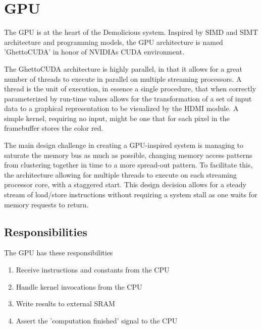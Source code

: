 \documentclass[../main/report.tex]{subfiles}
\begin{document}
\chapter{GPU}

The GPU is at the heart of the Demolicious system.
Inspired by SIMD and SIMT architecture and programming models, the GPU architecture is named 'GhettoCUDA' in honor of NVIDIAs CUDA environment.

The GhettoCUDA architecture is highly parallel, in that it allows for a great number of threads to execute in parallel on multiple streaming processors.
A thread is the unit of execution, in essence a single procedure, that when correctly parameterized by run-time values allows for the transformation of a set of input data to a graphical representation to be visualized by the HDMI module.
A simple kernel, requiring no input, might be one that for each pixel in the framebuffer stores the color red.

The main design challenge in creating a GPU-inspired system is managing to saturate the memory bus as much as possible, changing memory access patterns from clustering together in time to a more spread-out pattern.
To facilitate this, the architecture allowing for multiple threads to execute on each streaming processor core, with a staggered start.
This design decision allows for a steady stream of load/store instructions without requiring a system stall as one waits for memory requests to return.

\section{Responsibilities}

The GPU has these responsibilities
\begin{enumerate}
  \item
    Receive instructions and constants from the CPU
  \item
    Handle kernel invocations from the CPU
  \item
    Write results to external SRAM
  \item
    Assert the 'computation finished' signal to the CPU
\end{enumerate}
\end{document}
